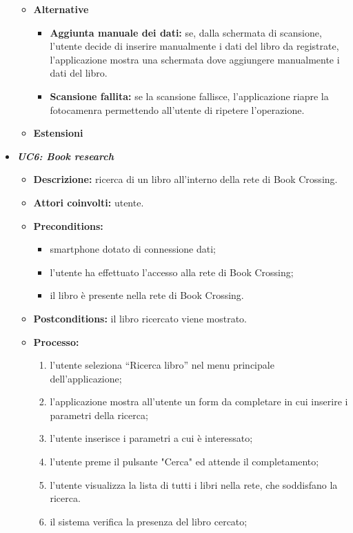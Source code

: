 \begin{itemize}
\begin{itemize}
\begin{enumerate}
		\end{enumerate}
		\item \textbf{Alternative}
		\begin{itemize}
			\item \textbf{Aggiunta manuale dei dati:} se, dalla schermata di scansione, l'utente decide di inserire manualmente i dati del libro da registrate, l'applicazione mostra una schermata dove aggiungere manualmente i dati del libro.
			\item \textbf{Scansione fallita:} se la scansione fallisce, l'applicazione riapre la fotocamenra permettendo all'utente di ripetere l'operazione.
		\end{itemize}
		\item \textbf{Estensioni}
	\end{itemize}
	\item \textbf{\textit{UC6: Book research}}
	\begin{itemize}
		\item \textbf{Descrizione:} ricerca di un libro all’interno della rete di Book Crossing.
		\item \textbf{Attori coinvolti:} utente.
		\item \textbf{Preconditions:}
		\begin{itemize}
			\item smartphone dotato di connessione dati;
			\item l’utente ha effettuato l’accesso alla rete di Book Crossing;
			\item il libro è presente nella rete di Book Crossing.
		\end{itemize}
		\item \textbf{Postconditions:} il libro ricercato viene mostrato.
		\item \textbf{Processo:}
		\begin{enumerate}
			\item l’utente seleziona “Ricerca libro” nel menu principale dell’applicazione;
			\item l’applicazione mostra all'utente un form da completare in cui inserire i parametri della ricerca;
			\item l’utente inserisce i parametri a cui è interessato;
			\item l'utente preme il pulsante "Cerca" ed attende il completamento;
			\item l'utente visualizza la lista di tutti i libri nella rete, che soddisfano la ricerca.
			\item il sistema verifica la presenza del libro cercato;

\end{enumerate}
\end{itemize}
\end{itemize}
